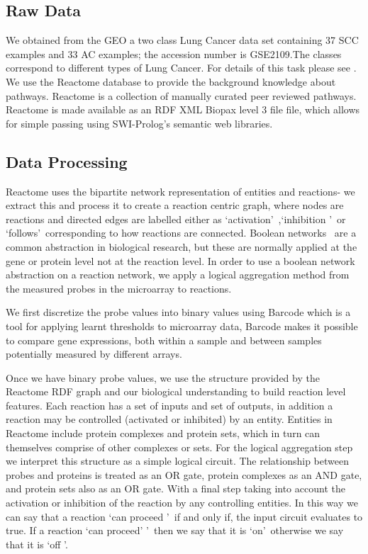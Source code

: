 \documentclass[runningheads,a4paper]{llncs}
\begin{document}
\subsection{Raw Data} 
We obtained from the GEO a two class Lung Cancer data set containing 37 SCC examples and 33 AC examples; the accession number is GSE2109.The classes correspond to different types of Lung Cancer. For details of this task please see \citep{rhrissorrakrai_sbv_2013}.  
We use the Reactome database to provide the background knowledge about pathways. Reactome \citep{croft_reactome_2013} is a collection of manually curated peer reviewed pathways. Reactome is made available as an RDF XML Biopax level 3 file file, which allows for simple passing using SWI-Prolog's semantic web libraries. 


\subsection{Data Processing}
Reactome uses the bipartite network representation of entities and reactions- we extract this and process it to create a reaction centric graph, where nodes are reactions and directed edges are labelled either as \lq activation\rq\ ,\lq inhibition \rq\ or \lq follows\rq\ corresponding to how reactions are connected. 
Boolean networks~\citep{wang_boolean_2012} are a common abstraction in biological research, but these are normally applied at the gene or protein level not at the reaction level. In order to use a boolean network abstraction on a reaction network, we apply a logical aggregation method from the measured probes in the microarray to reactions.

We first discretize the probe values into binary values using Barcode \citep{mccall_gene_2014} which is a tool for applying learnt thresholds to microarray data,  Barcode makes it possible to compare gene expressions, both within a sample and between samples potentially measured by different arrays. 

Once we have binary probe values, we use the structure provided by
the Reactome RDF graph and our biological understanding to build reaction level features. Each reaction has a set of inputs and set of outputs, in addition a reaction may be controlled (activated or inhibited) by an entity. Entities in Reactome include protein complexes and protein sets, which in turn can themselves comprise of other complexes or sets. For the logical aggregation step we interpret this structure as a simple logical circuit. The relationship between probes and proteins is treated as an OR gate, protein complexes as an AND gate, and protein sets also as an OR gate. With a final step taking into account the activation or inhibition of the reaction by any controlling entities. In this way we can say that a reaction \lq can proceed \rq\ if and only if, the input circuit evaluates to true. If a reaction \lq can proceed' \rq\ then we say that it is \lq on\rq\ otherwise we say that it is \lq off \rq. %
\end{document}
